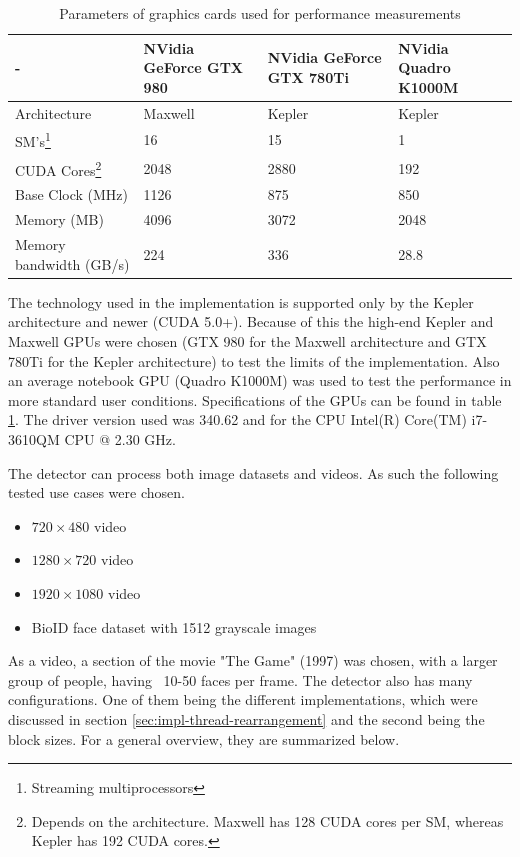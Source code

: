 \begin{center}
\begin{table}[htbp]
\begin{tabularx}{\textwidth}{| X | X | X | X |}
\hline
- & NVidia GeForce GTX 980 & NVidia GeForce GTX 780Ti & NVidia Quadro K1000M \\
\hline
Architecture & Maxwell & Kepler & Kepler \\
\hline
SM's\footnote{Streaming multiprocessors} & 16 & 15 & 1 \\
\hline
CUDA Cores\footnote{Depends on the architecture. Maxwell has 128 CUDA cores per SM, whereas Kepler has 192 CUDA cores.} & 2048 & 2880 & 192 \\
\hline
Base Clock (MHz) & 1126 & 875 & 850 \\
\hline
Memory (MB) & 4096 & 3072 & 2048 \\
\hline
Memory bandwidth (GB/s) & 224 & 336 & 28.8 \\
\hline
\end{tabularx}
\caption{Parameters of graphics cards used for performance measurements}
\label{tab:parameters-gpu}
\end{table}
\end{center}

The technology used in the implementation is supported only by the Kepler architecture and newer (CUDA 5.0+). Because of this the high-end Kepler and Maxwell GPUs were chosen (GTX 980 for the Maxwell architecture and GTX 780Ti for the Kepler architecture) to test the limits of the implementation. Also an average notebook GPU (Quadro K1000M) was used to test the performance in more standard user conditions. Specifications of the GPUs can be found in table \ref{tab:parameters-gpu}. The driver version used was 340.62 and for the CPU Intel(R) Core(TM) i7-3610QM CPU @ 2.30 GHz.

The detector can process both image datasets and videos. As such the following tested use cases were chosen.

\begin{itemize}
	\item $720 \times 480$ video
	\item $1280 \times 720$ video
	\item $1920 \times 1080$ video
	\item BioID face dataset with 1512 grayscale images
\end{itemize}

As a video, a section of the movie "The Game" (1997) was chosen, with a larger group of people, having ~10-50 faces per frame. The detector also has many configurations. One of them being the different implementations, which were discussed in section \ref{sec:impl-thread-rearrangement} and the second being the block sizes. For a general overview, they are summarized below.

